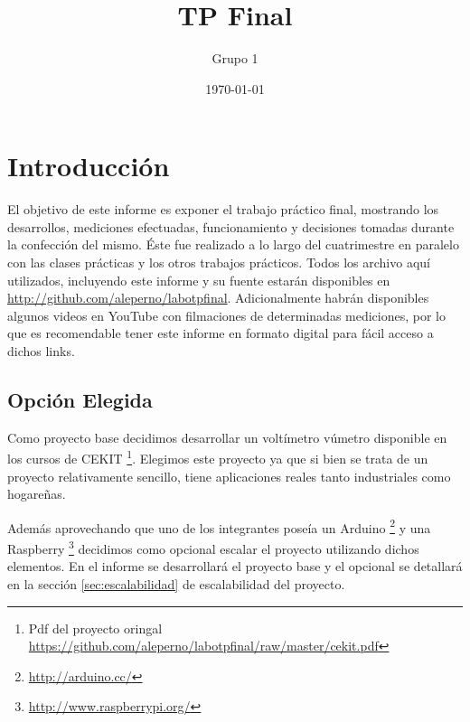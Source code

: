 \documentclass[12pt,a4paper]{article}
\title{TP Final}
\author{
        Grupo 1
}
\date{\today}
\begin{document}



\newpage\null\thispagestyle{empty}\newpage

\maketitle
\newpage\null\thispagestyle{empty}\newpage

\newpage
\tableofcontents

\newpage\null\thispagestyle{empty}\newpage

\newpage


\newpage 
\section{Introducción}
	El objetivo de este informe es exponer el trabajo práctico final, mostrando los desarrollos, mediciones efectuadas, funcionamiento y decisiones tomadas durante la confección del mismo. Éste fue realizado a lo largo del cuatrimestre en paralelo con las clases prácticas y los otros trabajos prácticos. Todos los archivo aquí utilizados, incluyendo este informe y su fuente estarán disponibles en \url{http://github.com/aleperno/labotpfinal}. Adicionalmente habrán disponibles algunos videos en YouTube con filmaciones de determinadas mediciones, por lo que es recomendable tener este informe en formato digital para fácil acceso a dichos links.


	\subsection{Opción Elegida}
		Como proyecto base decidimos desarrollar un voltímetro vúmetro disponible en los cursos de CEKIT \footnote{Pdf del proyecto oringal \url{https://github.com/aleperno/labotpfinal/raw/master/cekit.pdf}}. Elegimos este proyecto ya que si bien se trata de un proyecto relativamente sencillo, tiene aplicaciones reales tanto industriales como hogareñas.

		Además aprovechando que uno de los integrantes poseía un Arduino \footnote{\url{http://arduino.cc/}} y una Raspberry \footnote{\url{http://www.raspberrypi.org/}} decidimos como opcional escalar el proyecto utilizando dichos elementos. En el informe se desarrollará el proyecto base y el opcional se detallará en la sección \ref{sec:escalabilidad} de escalabilidad del proyecto.
\end{document}
